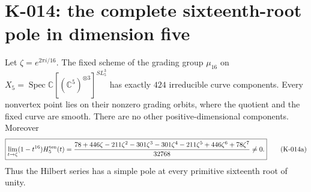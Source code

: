 \section{K-014: the complete sixteenth-root pole in dimension five}

\begin{theorem}[K-014]
Let $\zeta=e^{2\pi i/16}$.  The fixed scheme of the grading group
$\mu_{16}$ on
$X_5=\operatorname{Spec}\mathbb C[(\mathbb C^5)^{\otimes3}]^{SL_5^3}$
has exactly $424$ irreducible curve components.  Every nonvertex
point lies on their nonzero grading orbits, where the quotient and
the fixed curve are smooth.  There are no other positive-dimensional
components.  Moreover
\[
 \boxed{\displaystyle
 \lim_{t\to\zeta}(1-t^{16})H^{\rm ten}_5(t)
 =\frac{78+446\zeta-211\zeta^2-301\zeta^3-301\zeta^4
              -211\zeta^5+446\zeta^6+78\zeta^7}{32768}\ne0.}
                                                               \tag{K-014a}
\]
Thus the Hilbert series has a simple pole at every primitive
sixteenth root of unity.
\end{theorem}

